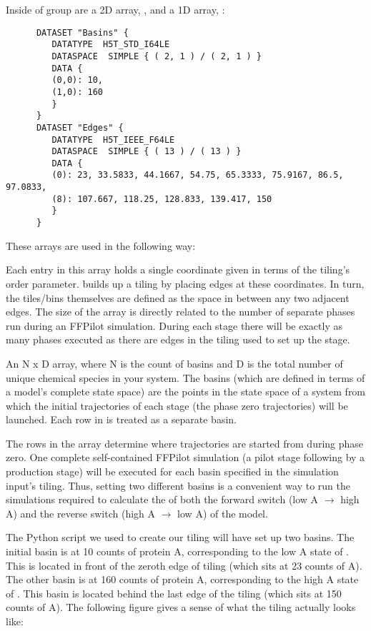 {Inside of group  are a 2D array, \code{\tilingbasins}, and a 1D array, \code{\tilingedges}:
\begin{verbatim}
      DATASET "Basins" {
         DATATYPE  H5T_STD_I64LE
         DATASPACE  SIMPLE { ( 2, 1 ) / ( 2, 1 ) }
         DATA {
         (0,0): 10,
         (1,0): 160
         }
      }
      DATASET "Edges" {
         DATATYPE  H5T_IEEE_F64LE
         DATASPACE  SIMPLE { ( 13 ) / ( 13 ) }
         DATA {
         (0): 23, 33.5833, 44.1667, 54.75, 65.3333, 75.9167, 86.5, 97.0833,
         (8): 107.667, 118.25, 128.833, 139.417, 150
         }
      }
\end{verbatim}
These arrays are used in the following way:
\begin{description}[style=nextline]
    \item[\code{\tilingedges}] Each entry in this array holds a single coordinate given in terms of the tiling's order parameter.  builds up a tiling by placing edges at these coordinates. In turn, the tiles/bins themselves are defined as the space in between any two adjacent edges. The size of the \code{\tilingedges} array is directly related to the number of separate phases run during an FFPilot simulation. During each stage there will be exactly as many phases executed as there are edges in the tiling used to set up the stage.
    \item[\code{\tilingbasins}] An N x D array, where N is the count of basins and D is the total number of unique chemical species in your system. The basins (which are defined in terms of a model's complete state space) are the points in the state space of a system from which the initial trajectories of each stage (\ie the phase zero trajectories) will be launched. Each row in \code{\tilingbasins} is treated as a separate basin.
\end{description}

The rows in the \code{\tilingbasins} array determine where trajectories are started from during phase zero. One complete self-contained FFPilot simulation (\ie a pilot stage following by a production stage) will be executed for each basin specified in the simulation input's tiling. Thus, setting two different basins is a convenient way to run the simulations required to calculate the  of both the forward switch (low A $\rightarrow$ high A) and the reverse switch (high A $\rightarrow$ low A) of the  model.

The Python script we used to create our tiling will have set up two basins. The initial basin is at 10 counts of protein A, corresponding to the low A state of . This is located in front of the zeroth edge of tiling (which sits at 23 counts of A). The other basin is at 160 counts of protein A, corresponding to the high A state of . This basin is located behind the last edge of the tiling (which sits at 150 counts of A). The following figure gives a sense of what the tiling actually looks like:

}
